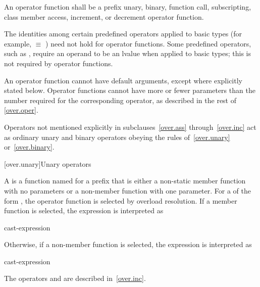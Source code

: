 \pnum
An operator function shall be a
prefix unary, binary, function call, subscripting, class member access, increment, or decrement
operator function.

\pnum
{}%
\begin{note}
The identities among certain predefined operators applied to basic types
(for example,
 $\equiv$
)
need not hold for operator functions.
Some predefined operators, such as
\tcode{+=},
require an operand to be an lvalue when applied to basic types;
this is not required by operator functions.
\end{note}

\pnum
{}%
An operator function cannot have default arguments,
except where explicitly stated below.
Operator
functions cannot have more or fewer parameters than the
number required for the corresponding operator, as
described in the rest of \ref{over.oper}.

\pnum
Operators not mentioned explicitly in subclauses~\ref{over.ass} through~\ref{over.inc}
act as ordinary unary and binary
operators obeying the rules of~\ref{over.unary} or~\ref{over.binary}.%
%

[over.unary]{Unary operators}%
%

\pnum
A 
is a function named 
for a prefix  
that is either
a non-static member function with no parameters or
a non-member function with one parameter.
%
For a 
of the form ,
the operator function is selected by overload resolution.
If a member function is selected,
the expression is interpreted as
\begin{ncsimplebnf}
cast-expression    \terminal{(}\terminal{)}
\end{ncsimplebnf}
Otherwise, if a non-member function is selected,
the expression is interpreted as
\begin{ncsimplebnf}
  \terminal{(} cast-expression \terminal{)}
\end{ncsimplebnf}
\begin{note}
The operators \tcode{++} and \tcode{--}
are described in~\ref{over.inc}.
\end{note}

